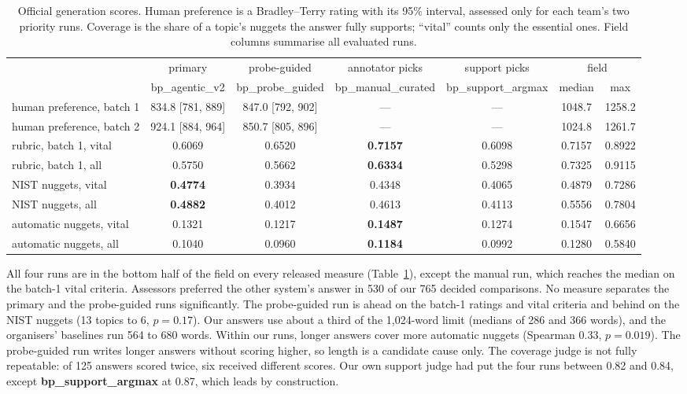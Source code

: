 \documentclass[sigconf,nonacm]{acmart}
\newcommand{\run}[1]{\mbox{\textbf{#1}}}   %
\begin{document}
\begin{table}[t]
\caption{Official generation scores. Human preference is a Bradley--Terry rating with
its 95\% interval, assessed only for each team's two priority runs. Coverage is the
share of a topic's nuggets the answer fully supports; ``vital'' counts only the
essential ones. Field columns summarise all evaluated runs.}
\label{tab:officialgen}
\small
\begin{tabular}{lcccccc}
\toprule
 & primary & probe-guided & annotator picks & support picks & \multicolumn{2}{c}{field} \\
\cmidrule(lr){6-7}
 & bp\_agentic\_v2 & bp\_probe\_guided & bp\_manual\_curated & bp\_support\_argmax & median & max \\
\midrule
human preference, batch 1 & 834.8 [781, 889] & 847.0 [792, 902] & --- & --- & 1048.7 & 1258.2 \\
human preference, batch 2 & 924.1 [884, 964] & 850.7 [805, 896] & --- & --- & 1024.8 & 1261.7 \\
\midrule
rubric, batch 1, vital & 0.6069 & 0.6520 & \textbf{0.7157} & 0.6098 & 0.7157 & 0.8922 \\
rubric, batch 1, all & 0.5750 & 0.5662 & \textbf{0.6334} & 0.5298 & 0.7325 & 0.9115 \\
NIST nuggets, vital & \textbf{0.4774} & 0.3934 & 0.4348 & 0.4065 & 0.4879 & 0.7286 \\
NIST nuggets, all & \textbf{0.4882} & 0.4012 & 0.4613 & 0.4113 & 0.5556 & 0.7804 \\
automatic nuggets, vital & 0.1321 & 0.1217 & \textbf{0.1487} & 0.1274 & 0.1547 & 0.6656 \\
automatic nuggets, all & 0.1040 & 0.0960 & \textbf{0.1184} & 0.0992 & 0.1280 & 0.5840 \\
\bottomrule
\end{tabular}
\end{table}

All four runs are in the bottom half of the field on every released measure
(Table~\ref{tab:officialgen}), except the manual run, which reaches the median on the
batch-1 vital criteria. Assessors preferred the other system's answer in 530 of our
765 decided comparisons. No measure separates the primary and the probe-guided runs
significantly. The probe-guided run is ahead on the batch-1 ratings and vital
criteria and behind on the NIST nuggets (13 topics to 6, $p = 0.17$).
Our answers use about a third of the 1,024-word limit (medians of 286 and 366 words),
and the organisers' baselines run 564 to 680 words. Within our runs, longer answers
cover more automatic nuggets (Spearman 0.33, $p = 0.019$). The probe-guided run
writes longer answers without scoring higher, so length is a candidate cause only.
The coverage judge is not fully repeatable: of 125 answers scored twice, six received
different scores. Our own support judge had put the four runs between 0.82 and 0.84,
except \run{bp\_support\_argmax} at 0.87, which leads by construction.
\end{document}
